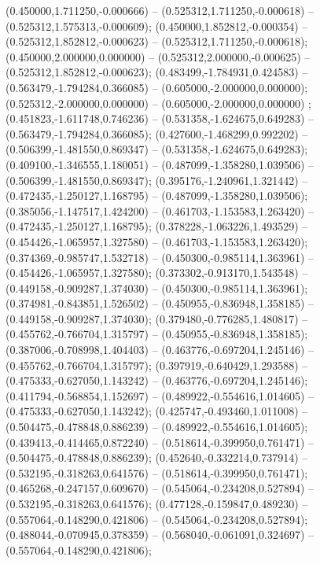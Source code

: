  (0.450000,1.711250,-0.000666) -- (0.525312,1.711250,-0.000618) -- (0.525312,1.575313,-0.000609);
 (0.450000,1.852812,-0.000354) -- (0.525312,1.852812,-0.000623) -- (0.525312,1.711250,-0.000618);
 (0.450000,2.000000,0.000000) -- (0.525312,2.000000,-0.000625) -- (0.525312,1.852812,-0.000623);
 (0.483499,-1.784931,0.424583) -- (0.563479,-1.794284,0.366085) -- (0.605000,-2.000000,0.000000);
 (0.525312,-2.000000,0.000000) -- (0.605000,-2.000000,0.000000) ;
 (0.451823,-1.611748,0.746236) -- (0.531358,-1.624675,0.649283) -- (0.563479,-1.794284,0.366085);
 (0.427600,-1.468299,0.992202) -- (0.506399,-1.481550,0.869347) -- (0.531358,-1.624675,0.649283);
 (0.409100,-1.346555,1.180051) -- (0.487099,-1.358280,1.039506) -- (0.506399,-1.481550,0.869347);
 (0.395176,-1.240961,1.321442) -- (0.472435,-1.250127,1.168795) -- (0.487099,-1.358280,1.039506);
 (0.385056,-1.147517,1.424200) -- (0.461703,-1.153583,1.263420) -- (0.472435,-1.250127,1.168795);
 (0.378228,-1.063226,1.493529) -- (0.454426,-1.065957,1.327580) -- (0.461703,-1.153583,1.263420);
 (0.374369,-0.985747,1.532718) -- (0.450300,-0.985114,1.363961) -- (0.454426,-1.065957,1.327580);
 (0.373302,-0.913170,1.543548) -- (0.449158,-0.909287,1.374030) -- (0.450300,-0.985114,1.363961);
 (0.374981,-0.843851,1.526502) -- (0.450955,-0.836948,1.358185) -- (0.449158,-0.909287,1.374030);
 (0.379480,-0.776285,1.480817) -- (0.455762,-0.766704,1.315797) -- (0.450955,-0.836948,1.358185);
 (0.387006,-0.708998,1.404403) -- (0.463776,-0.697204,1.245146) -- (0.455762,-0.766704,1.315797);
 (0.397919,-0.640429,1.293588) -- (0.475333,-0.627050,1.143242) -- (0.463776,-0.697204,1.245146);
 (0.411794,-0.568854,1.152697) -- (0.489922,-0.554616,1.014605) -- (0.475333,-0.627050,1.143242);
 (0.425747,-0.493460,1.011008) -- (0.504475,-0.478848,0.886239) -- (0.489922,-0.554616,1.014605);
 (0.439413,-0.414465,0.872240) -- (0.518614,-0.399950,0.761471) -- (0.504475,-0.478848,0.886239);
 (0.452640,-0.332214,0.737914) -- (0.532195,-0.318263,0.641576) -- (0.518614,-0.399950,0.761471);
 (0.465268,-0.247157,0.609670) -- (0.545064,-0.234208,0.527894) -- (0.532195,-0.318263,0.641576);
 (0.477128,-0.159847,0.489230) -- (0.557064,-0.148290,0.421806) -- (0.545064,-0.234208,0.527894);
 (0.488044,-0.070945,0.378359) -- (0.568040,-0.061091,0.324697) -- (0.557064,-0.148290,0.421806);
